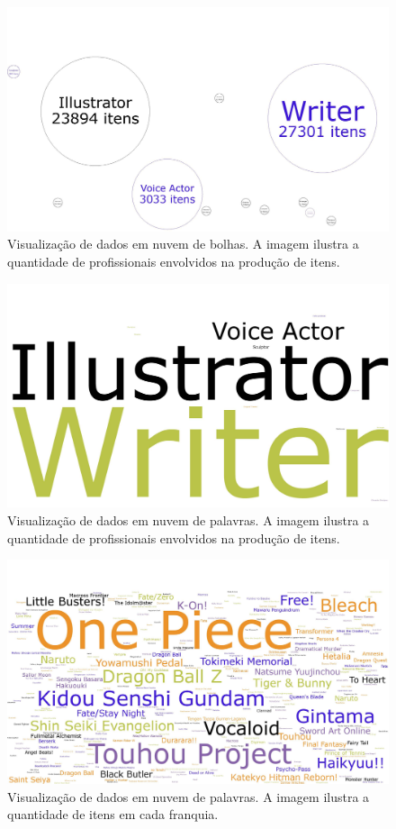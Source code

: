 \documentclass[12pt]{article}
\begin{document}
\begin{figure}[H]
\centering
\includegraphics[width=1\textwidth]{people_type_bubble.pdf}
\caption{Visualização de dados em nuvem de bolhas. A imagem ilustra a quantidade de profissionais envolvidos na produção de itens.} \label{collaborator}
\end{figure}

\begin{figure}[H]
\centering
\includegraphics[width=1\textwidth]{people_type-words.pdf}
\caption{Visualização de dados em nuvem de palavras. A imagem ilustra a quantidade de profissionais envolvidos na produção de itens.} \label{collaborator}
\end{figure}

\begin{figure}[H]
\centering
\includegraphics[width=1\textwidth]{collection_amount_words.pdf}
\caption{Visualização de dados em nuvem de palavras. A imagem ilustra a quantidade de itens em cada franquia.} \label{collaborator}
\end{figure}
\end{document}
